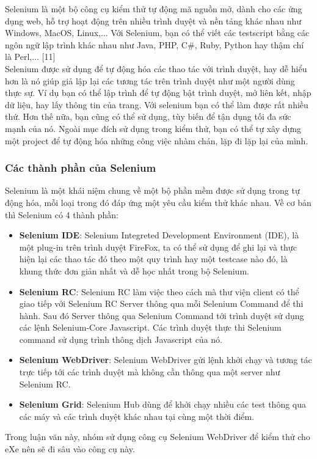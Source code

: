 Selenium là một bộ công cụ kiểm thử tự động mã nguồn mở, dành cho các ứng dụng web, hỗ trợ hoạt động trên nhiều trình duyệt và nền tảng khác nhau như Windows, MacOS, Linux,... Với Selenium, bạn có thể viết các testscript bằng các ngôn ngữ lập trình khác nhau như Java, PHP, C\#, Ruby, Python hay thậm chí là Perl,... [11]\\

Selenium được sử dụng để tự động hóa các thao tác với trình duyệt, hay dễ hiểu hơn là nó giúp giả lập lại các tương tác trên trình duyệt như một người dùng thực sự. Ví dụ bạn có thể lập trình để tự động bật trình duyệt, mở liên kết, nhập dữ liệu, hay lấy thông tin của trang. Với selenium bạn có thể làm được rất nhiều thứ. Hơn thế nữa, bạn cũng có thể sử dụng, tùy biến để tận dụng tối đa sức mạnh của nó. Ngoài mục đích sử dụng trong kiểm thử, bạn có thể tự xây dựng một project để tự động hóa những công việc nhàm chán, lặp đi lặp lại của mình.\\


\subsubsection{Các thành phần của Selenium}
Selenium là một khái niệm chung về một bộ phần mềm được sử dụng trong tự động hóa, mỗi loại trong đó đáp ứng một yêu cầu kiểm thử khác nhau. Về cơ bản thì Selenium có 4 thành phần:

\begin{itemize}
	\item \textbf{Selenium IDE}: Selenium Integreted Development Environment (IDE), là một plug-in trên trình duyệt FireFox, ta có thể sử dụng để ghi lại và thực hiện lại các thao tác đó theo một quy trình hay một testcase nào đó, là khung thức đơn giản nhất và dễ học nhất trong bộ Selenium.
	
	\item \textbf{Selenium RC}: Selenium RC làm việc theo cách mà thư viện client có thể giao tiếp với Selenium RC Server thông qua mỗi Selenium Command để thi hành. Sau đó Server thông qua Selenium Command tới trình duyệt sử dụng các lệnh Selenium-Core Javascript. Các trình duyệt thực thi Selenium command sử dụng trình thông dịch Javascript của nó.
	
	\item \textbf{Selenium WebDriver}: Selenium WebDriver gửi lệnh khởi chạy và tương tác trực tiếp tới các trình duyệt mà không cần thông qua một server như Selenium RC.
	
	\item \textbf{Selenium Grid}: Selenium Hub dùng để khởi chạy nhiều các test thông qua các máy và các trình duyệt khác nhau tại cùng một thời điểm.
\end{itemize}
Trong luận văn này, nhóm sử dụng công cụ Selenium WebDriver để kiểm thử cho eXe nên sẽ đi sâu vào công cụ này.

